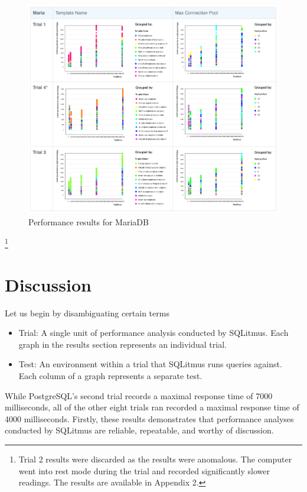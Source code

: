 \documentclass[12pt]{report}
\begin{document}
\begin{spacing}{1.9}
\begin{figure}[H]
	\end{figure}
	
	\begin{figure}[H]
		\centering
		\includegraphics[width=\textwidth]{MARIA.png}
		\caption{Performance results for MariaDB}
		
	\end{figure}
	
	\footnote{Trial 2 results were discarded as the results were anomalous. The computer went into rest mode during the trial and recorded significantly slower readings. The results are available in Appendix 2.}
	
	\clearpage
	
	\section{Discussion}
	Let us begin by disambiguating certain terms
	\begin{itemize}
		\item Trial: A single unit of performance analysis conducted by SQLitmus. Each graph in the results section represents an individual trial.
		\item Test: An environment within a trial that SQLitmus runs queries against. Each column of a graph represents a separate test.
	\end{itemize}
	While PostgreSQL's second trial records a maximal response time of 7000 milliseconds,  all of the other eight trials ran recorded a maximal response time of 4000 milliseconds. Firstly, these results demonstrates that performance analyses conducted by SQLitmus are reliable, repeatable, and worthy of discussion.
	

\end{spacing}
\end{document}
